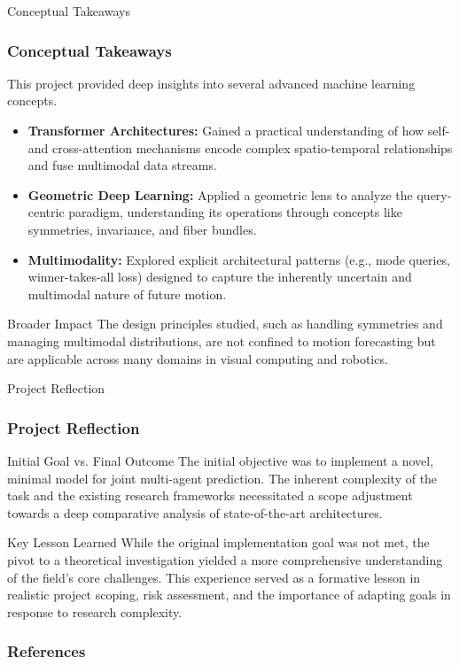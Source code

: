 \documentclass[10pt,aspectratio=169]{beamer}
\begin{document}
\begin{frame}{Conceptual Takeaways}
    \frametitle{Conceptual Takeaways}
    This project provided deep insights into several advanced machine learning concepts.
    \begin{itemize}
        \item \textbf{Transformer Architectures:} Gained a practical understanding of how self- and cross-attention mechanisms encode complex spatio-temporal relationships and fuse multimodal data streams.
        \item \textbf{Geometric Deep Learning:} Applied a geometric lens to analyze the query-centric paradigm, understanding its operations through concepts like symmetries, invariance, and fiber bundles.
        \item \textbf{Multimodality:} Explored explicit architectural patterns (e.g., mode queries, winner-takes-all loss) designed to capture the inherently uncertain and multimodal nature of future motion.
    \end{itemize}
    \begin{block}{Broader Impact}
        The design principles studied, such as handling symmetries and managing multimodal distributions, are not confined to motion forecasting but are applicable across many domains in visual computing and robotics.
    \end{block}
\end{frame}

\begin{frame}{Project Reflection}
    \frametitle{Project Reflection}
    \begin{block}{Initial Goal vs. Final Outcome}
        The initial objective was to implement a novel, minimal model for joint multi-agent prediction. The inherent complexity of the task and the existing research frameworks necessitated a scope adjustment towards a deep comparative analysis of state-of-the-art architectures.
    \end{block}

    \begin{alertblock}{Key Lesson Learned}
        While the original implementation goal was not met, the pivot to a theoretical investigation yielded a more comprehensive understanding of the field's core challenges. This experience served as a formative lesson in realistic project scoping, risk assessment, and the importance of adapting goals in response to research complexity.
    \end{alertblock}
\end{frame}

\begin{frame}[allowframebreaks]
  \frametitle{References}
  
  
\end{frame}
\end{document}

